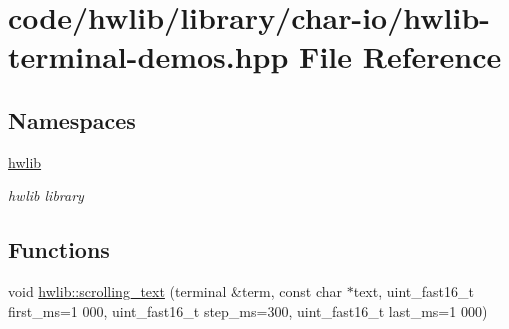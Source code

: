 \hypertarget{hwlib-terminal-demos_8hpp}{}\section{code/hwlib/library/char-\/io/hwlib-\/terminal-\/demos.hpp File Reference}
\label{hwlib-terminal-demos_8hpp}
\subsection*{Namespaces}
\begin{DoxyCompactItemize}
\item 
 \hyperlink{namespacehwlib}{hwlib}
\begin{DoxyCompactList}\small\item\em hwlib library \end{DoxyCompactList}\end{DoxyCompactItemize}
\subsection*{Functions}
\begin{DoxyCompactItemize}
\item 
void \hyperlink{namespacehwlib_a26e9f9f673f95ec60d66ef4f269fe45d}{hwlib\+::scrolling\+\_\+text} (terminal \&term, const char $\ast$text, uint\+\_\+fast16\+\_\+t first\+\_\+ms=1 \textquotesingle{}000, uint\+\_\+fast16\+\_\+t step\+\_\+ms=300, uint\+\_\+fast16\+\_\+t last\+\_\+ms=1 \textquotesingle{}000)
\end{DoxyCompactItemize}
